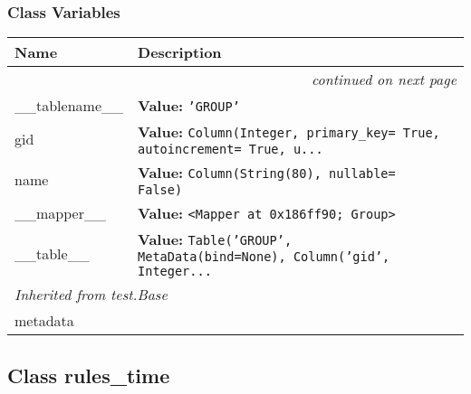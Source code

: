   \subsubsection{Class Variables}

    \vspace{-1cm}
\hspace{\varindent}\begin{longtable}{|p{\varnamewidth}|p{\vardescrwidth}|l}
\cline{1-2}
\cline{1-2} \centering \textbf{Name} & \centering \textbf{Description}& \\
\cline{1-2}
\endhead\cline{1-2}\multicolumn{3}{r}{\small\textit{continued on next page}}\\\endfoot\cline{1-2}
\endlastfoot\raggedright \_\-\_\-t\-a\-b\-l\-e\-n\-a\-m\-e\-\_\-\_\- & \raggedright \textbf{Value:} 
{\tt \texttt{'}\texttt{GROUP}\texttt{'}}&\\
\cline{1-2}
\raggedright g\-i\-d\- & \raggedright \textbf{Value:} 
{\tt Column(Integer, primary\_key= True, autoincrement= True, u\texttt{...}}&\\
\cline{1-2}
\raggedright n\-a\-m\-e\- & \raggedright \textbf{Value:} 
{\tt Column(String(80), nullable= False)}&\\
\cline{1-2}
\raggedright \_\-\_\-m\-a\-p\-p\-e\-r\-\_\-\_\- & \raggedright \textbf{Value:} 
{\tt {\textless}Mapper at 0x186ff90; Group{\textgreater}}&\\
\cline{1-2}
\raggedright \_\-\_\-t\-a\-b\-l\-e\-\_\-\_\- & \raggedright \textbf{Value:} 
{\tt Table('GROUP', MetaData(bind=None), Column('gid', Integer\texttt{...}}&\\
\cline{1-2}
\multicolumn{2}{|l|}{\textit{Inherited from test.Base}}\\
\multicolumn{2}{|p{\varwidth}|}{\raggedright metadata}\\
\cline{1-2}
\end{longtable}



\subsection{Class rules\_time}


